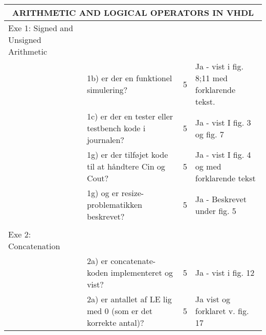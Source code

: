 \begin{table}[h]
    \small
    \begin{tabularx}{\textwidth}{p{3.5cm}Xp{5mm}X}

        \toprule
        \multicolumn{4}{c}{ARITHMETIC AND LOGICAL OPERATORS IN VHDL}                                                                                                                                                \\\midrule
        Exe 1: Signed and Unsigned Arithmetic &                                                                                                     &   &                                                           \\
                                              & 1b) er der en funktionel simulering?                                                                & 5 & Ja - vist i fig. 8;11 med forklarende tekst.              \\
                                              & 1c) er der en tester eller testbench kode i journalen?                                              & 5 & Ja - vist I fig. 3 og fig. 7                              \\
                                              & 1g) er der tilføjet kode til at håndtere Cin og Cout?                                               & 5 & Ja - vist I fig. 4 og med forklarende tekst               \\
                                              & 1g) og er resize-problematikken beskrevet?                                                          & 5 & Ja - Beskrevet under fig. 5                               \\
                                              &                                                                                                     &   &                                                           \\ \midrule
        Exe 2: Concatenation                  &                                                                                                     &   &                                                           \\
                                              & 2a) er concatenate-koden implementeret og vist?                                                     & 5 & Ja - vist i fig. 12                                       \\
                                              & 2a) er antallet af LE lig med 0 (som er det korrekte antal)?                                        & 5 & Ja vist og forklaret v. fig. 17                           \\

\end{tabularx}
\end{table}
